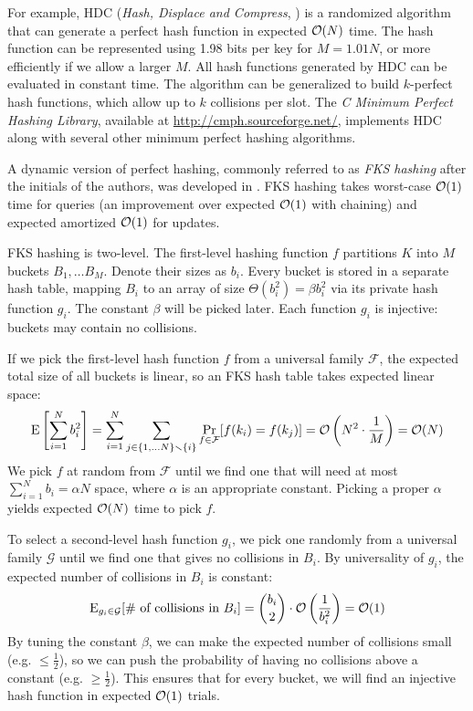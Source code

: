 For example, HDC (\textit{Hash, Displace and Compress},
\cite{hdc-hashing}) is a randomized algorithm that can generate a perfect
hash function in expected $\mathcal{O}(N)$ time. The hash function can be represented
using 1.98 bits per key for $M=1.01 N$, or more efficiently if we allow a larger
$M$. All hash functions generated by HDC can be evaluated in constant time.
The algorithm can be generalized to build $k$-perfect hash functions, which
allow up to $k$ collisions per slot. The \textit{C Minimum Perfect
Hashing Library}, available at \url{http://cmph.sourceforge.net/}, implements
HDC along with several other minimum perfect hashing algorithms.

A dynamic version of perfect hashing, commonly referred to as \emph{FKS
hashing} after the initials of the authors, was developed in \cite{fks-hashing}.
FKS hashing takes worst-case $\mathcal{O}(1)$ time for queries (an improvement over
expected $\mathcal{O}(1)$ with chaining) and expected amortized $\mathcal{O}(1)$ for updates.

FKS hashing is two-level. The first-level hashing function $f$ partitions
$K$ into $M$ buckets $B_1,\ldots B_M$. Denote their sizes as $b_i$.
Every bucket is stored in a separate hash table, mapping $B_i$ to an array
of size $\Theta(b_i^2)=\beta b_i^2$ via its private hash function $g_i$.
The constant $\beta$ will be picked later.
Each function $g_i$ is injective: buckets may contain no collisions.

If we pick the first-level hash function $f$ from a universal family
$\mathcal{F}$, the expected total size of all buckets is linear, so an FKS
hash table takes expected linear space:
$$\mathrm{E}\left[\sum_{i=1}^N b_i^2\right]=
	\sum_{i=1}^N \sum_{j\in\{1,\ldots N\}\smallsetminus\{i\}}
	\Pr_{f\in\mathcal{F}}[f(k_i)=f(k_j)]=
	\mathcal{O}\left(N^2\cdot\frac{1}{M}\right)=\mathcal{O}(N)$$
We pick $f$ at random from $\mathcal{F}$ until we find one that will need at
most $\sum_{i=1}^N b_i=\alpha N$ space, where $\alpha$ is an appropriate
constant. Picking a proper $\alpha$ yields expected $\mathcal{O}(N)$ time to pick $f$.

To select a second-level hash function $g_i$, we pick one randomly from
a universal family $\mathcal{G}$ until we find one that gives no collisions
in $B_i$. By universality of $g_i$, the expected number of collisions in $B_i$
is constant:
$$\mathrm{E}_{g_i\in\mathcal{G}}[\text{\# of collisions in }B_i]=
	{b_i\choose 2}\cdot\mathcal{O}\left(\frac{1}{b_i^2}\right)=\mathcal{O}(1)$$
By tuning the constant $\beta$, we can make the expected number of collisions
small (e.g. $\leq\frac{1}{2}$), so we can push the probability of having no
collisions above a constant (e.g. $\geq\frac{1}{2}$). This ensures that for
every bucket, we will find an injective hash function in expected $\mathcal{O}(1)$
trials.

